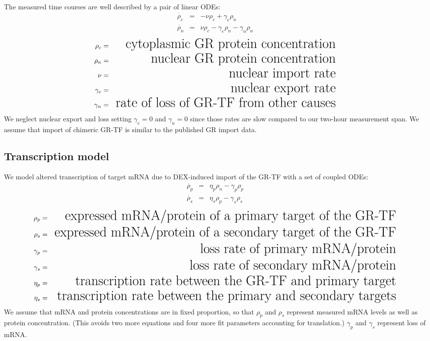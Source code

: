 \documentclass[aspb,landscape]{a0poster}
\begin{document}
\begin{multicols}{4}
  The measured time courses are well described by a pair of linear ODEs:
  \begin{eqnarray*}
    \dot{\rho_c} &=& -\nu \rho_c + \gamma_e \rho_n \\
    \dot{\rho_n} &=&  \nu \rho_c - \gamma_e \rho_n - \gamma_n \rho_n
  \end{eqnarray*}
  \begin{eqnarray*}
    \rho_c &=& \text{\small cytoplasmic GR protein concentration} \\
    \rho_n &=& \text{\small nuclear GR protein concentration} \\
    \nu &=& \text{\small nuclear import rate} \\
    \gamma_e &=& \text{\small nuclear export rate} \\
    \gamma_n &=& \text{\small rate of loss of GR-TF from other causes}
  \end{eqnarray*}
  We neglect nuclear export and loss setting $\gamma_e=0$ and $\gamma_n=0$ since those rates are slow compared to our two-hour measurement span.
  We assume that import of chimeric GR-TF is similar to the published GR import data.

  \subsection*{Transcription model}

  We model altered transcription of target mRNA due to DEX-induced import of the GR-TF with a set of coupled ODEs:
  \begin{eqnarray*}
    \dot{\rho_p} &=& \eta_p \rho_n  - \gamma_p \rho_p  \\
    \dot{\rho_s} &=& \eta_s \rho_p  - \gamma_s \rho_s
  \end{eqnarray*}
  \begin{eqnarray*}
    \rho_p &=& \text{\small expressed mRNA/protein of a primary target of the GR-TF} \\
    \rho_s &=& \text{\small expressed mRNA/protein of a secondary target of the GR-TF} \\
    \gamma_p &=& \text{\small loss rate of primary mRNA/protein} \\
    \gamma_s &=& \text{\small loss rate of secondary mRNA/protein} \\
    \eta_p &=& \text{\small transcription rate between the GR-TF and primary target} \\
    \eta_s &=& \text{\small transcription rate between the primary and secondary targets}
  \end{eqnarray*}
  We assume that mRNA and protein concentrations are in fixed proportion, so that $\rho_p$ and $\rho_s$ represent measured mRNA levels as well as protein concentration.
  (This avoids two more equations and four more fit parameters accounting for translation.)
  $\gamma_p$ and  $\gamma_s$ represent loss of mRNA.
  

\end{multicols}
\end{document}
